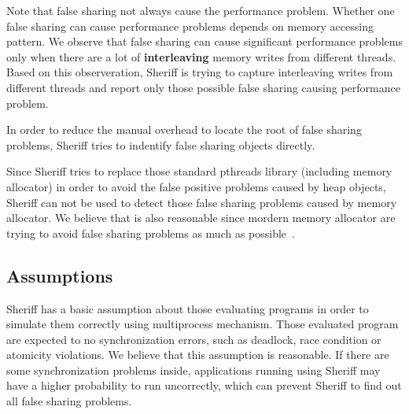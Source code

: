Note that false sharing not always cause the performance problem. 
Whether one false sharing can cause performance problems depends on memory accessing pattern. 
We observe that false sharing can cause significant performance problems 
only when there are a lot of \textbf{interleaving} memory writes from different threads. 
Based on this observeration, Sheriff is trying to capture interleaving writes from different threads and 
report only those possible false sharing causing performance problem.

In order to reduce the manual overhead to locate the root of false sharing problems, Sheriff tries to indentify 
false sharing objects directly. 

Since Sheriff tries to replace those standard pthreads library (including memory allocator) 
in order to avoid the false positive problems 
caused by heap objects, Sheriff can not be used to detect those false sharing problems 
caused by memory allocator. 
We believe that is also reasonable since mordern memory allocator are trying to 
avoid false sharing problems as 
much as possible~\cite{BergerMcKinleyBlumofeWilson:ASPLOS2000}. 
\subsection{Assumptions}
\label{overview:assumption}
Sheriff has a basic assumption about those evaluating programs 
in order to simulate them correctly using multiprocess mechanism.
Those evaluated program are expected to no synchronization errors, 
such as deadlock, race condition or atomicity violations. 
We believe that this assumption is reasonable. 
If there are some synchronization problems inside, applications running using Sheriff
may have a higher probability to run uncorrectly, which can prevent Sheriff to find out all false sharing problems.


